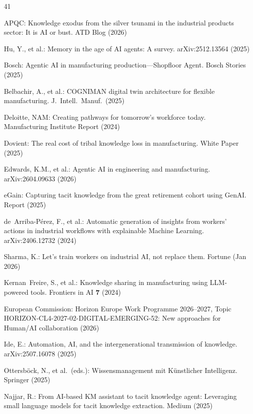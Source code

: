 \documentclass[]{ceurart}
\begin{document}
\begin{thebibliography}{41}

 APQC: Knowledge exodus from the silver tsunami in
  the industrial products sector: It is AI or bust. ATD Blog (2026)

 Hu, Y., et al.: Memory in the age of AI agents:
  A survey. arXiv:2512.13564 (2025)

 Bosch: Agentic AI in manufacturing
  production---Shopfloor Agent. Bosch Stories (2025)

 Belbachir, A., et al.: COGNIMAN digital twin
  architecture for flexible manufacturing. J.\ Intell.\ Manuf.\ (2025)

 Deloitte, NAM: Creating pathways for tomorrow's
  workforce today. Manufacturing Institute Report (2024)

 Dovient: The real cost of tribal knowledge loss
  in manufacturing. White Paper (2025)

 Edwards, K.M., et al.: Agentic AI in engineering
  and manufacturing. arXiv:2604.09633 (2026)

 eGain: Capturing tacit knowledge from the great
  retirement cohort using GenAI. Report (2025)

 de~Arriba-P\'erez, F., et al.: Automatic
  generation of insights from workers' actions in industrial workflows
  with explainable Machine Learning. arXiv:2406.12732 (2024)

 Sharma, K.: Let's train workers on industrial AI,
  not replace them. Fortune (Jan 2026)

 Kernan~Freire, S., et al.: Knowledge sharing in
  manufacturing using LLM-powered tools. Frontiers in AI \textbf{7}
  (2024)

 European Commission: Horizon Europe Work Programme
  2026--2027, Topic HORIZON-CL4-2027-02-DIGITAL-EMERGING-52: New
  approaches for Human/AI collaboration (2026)

 Ide, E.: Automation, AI, and the intergenerational
  transmission of knowledge. arXiv:2507.16078 (2025)

 Ottersb\"ock, N., et al.\ (eds.):
  Wissensmanagement mit K\"unstlicher Intelligenz. Springer (2025)

 Najjar, R.: From AI-based KM assistant to tacit
  knowledge agent: Leveraging small language models for tacit knowledge
  extraction. Medium (2025)


\end{thebibliography}
\end{document}
